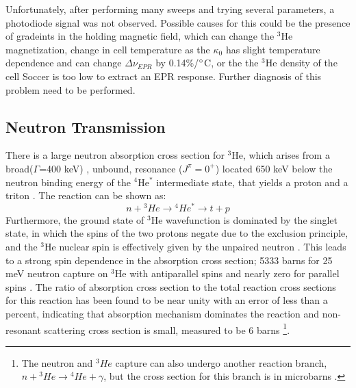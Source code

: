 Unfortunately, after performing many sweeps and trying several parameters, a photodiode signal was not observed. Possible causes for this could be the presence of gradeints in the holding magnetic field, which can change the $^3$He magnetization, change in cell temperature as the $\kappa_0$ has slight temperature dependence and can change $ \Delta \nu_{EPR}$ by 0.14\%/$\degree$C, or the the $^3$He density of the cell Soccer is too low to extract an EPR response. Further diagnosis of this problem need to be performed.


\subsection{Neutron Transmission}

There is a large neutron absorption cross section for $^3$He, which arises from a broad($\Gamma$=400 keV) , unbound, resonance ($J^{\pi}=0^{+}$) located 650 keV below the neutron binding energy of the $^4$He$^{*}$ intermediate state, that yields a proton and a triton \cite{Csoto1997}. The reaction can be shown as:
\begin{equation}
    n+ {^3He} \rightarrow {^4He^*} \rightarrow t + p
\end{equation}
Furthermore, the ground state of $^3$He wavefunction is dominated by the singlet state, in which the spins of the two protons negate due to the exclusion principle, and the $^3$He nuclear spin is effectively given by the unpaired neutron \cite{Bissey2002, Friar1990}. This leads to a strong spin dependence in the absorption cross section; 5333 barns for 25 meV neutron capture on $^3$He with antiparallel spins and nearly zero for parallel spins \cite{Passell1966}. The ratio of absorption cross section to the total reaction cross sections for this reaction has been found to be near unity with an error of less than a percent, indicating that absorption mechanism dominates the reaction \cite{Huber2014} and non-resonant scattering cross section is small, measured to be 6 barns \cite{Mughabghab1981} \footnote{The neutron and $^{3}He$ capture can also undergo another reaction branch, $n+ {^3He} \rightarrow {^4He} + \gamma$, but the cross section for this branch is in microbarns \cite{Zurmuhle1963}.}. 

